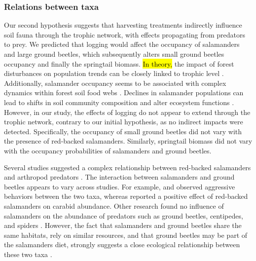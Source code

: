 \subsubsection*{Relations between taxa}
\label{disc:relations_between_taxa}

Our second hypothesis suggests that harvesting treatments indirectly influence soil fauna through the trophic network, with effects propagating from predators to prey. 
We predicted that logging would affect the occupancy of salamanders and large ground beetles, which subsequently alters small ground beetles occupancy and finally the springtail biomass. 
\hl{In theory,} the impact of forest disturbances on population trends can be closely linked to trophic level \citep{Gotelli2006FoodWebModels,Nolte2019Habitatspecialization}. 
Additionally, salamander occupancy seems to be associated with complex dynamics within forest soil food webs \citep{baileyEstimatingSiteOccupancy2004,Walton2006Salamandersforestfloor,Rooney2000impactsalamander}. 
Declines in salamander populations can lead to shifts in soil community composition and alter ecosystem functions \citep{Hairston1987evolutioncompeting,Wyman1998Experimentalassessment,Rooney2000impactsalamander,Walton2005Contrastingeffects}. 
However, in our study, the effects of logging do not appear to extend through the trophic network, contrary to our initial hypothesis, as no indirect impacts were detected. 
Specifically, the occupancy of small ground beetles did not vary with the presence of red-backed salamanders. 
Similarly, springtail biomass did not vary with the occupancy probabilities of salamanders and ground beetles. 

Several studies suggested a complex relationship between red-backed salamanders and arthropod predators \citep{Gall2003BehavioralInteractions,Walton2006Salamandersforestfloor,Hickerson2018Behavioralinteractions}. 
The interaction between salamanders and ground beetles appears to vary across studies.  
For example, \cite{Gall2003BehavioralInteractions} and \cite{Ovaska1988Predatorybehavior} observed aggressive behaviors between the two taxa, whereas \cite{Hickerson2012Interactionsforestfloor} reported a positive effect of red-backed salamanders on carabid abundance. 
Other research found no influence of salamanders on the abundance of predators such as ground beetles, centipedes, and spiders \citep{Hocking2013Effectsexperimental}. 
However, the fact that salamanders and ground beetles share the same habitats, rely on similar resources, and that ground beetles may be part of the salamanders diet, strongly suggests a close ecological relationship between these two taxa \citep{Jaeger1980MicrohabitatsTerrestrial,loveiEcologyBehaviorGround1996}.

